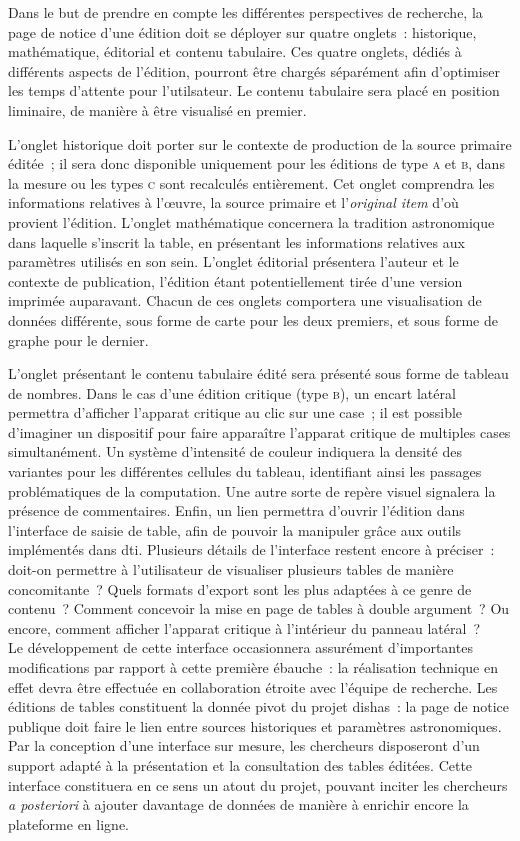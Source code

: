 \documentclass[a4paper,12pt,twoside]{book}
\newcommand{\eng}{\emph}
\newcommand{\oi}{\eng{original item}\xspace}
\newcommand{\dishas}{\gls{dishas}\xspace}
\newcommand{\dti}{\gls{dti}\xspace}
\begin{document}
Dans le but de prendre en compte les différentes perspectives de recherche, la page de notice d'une édition doit se déployer sur quatre onglets~: historique, mathématique, éditorial et contenu tabulaire. Ces quatre onglets, dédiés à différents aspects de l'édition, pourront être chargés séparément afin d'optimiser les temps d'attente pour l'utilsateur. Le contenu tabulaire sera placé en position liminaire, de manière à être visualisé en premier.

L'onglet historique doit porter sur le contexte de production de la source primaire éditée~; il sera donc disponible uniquement pour les éditions de type \textsc{a} et \textsc{b}, dans la mesure ou les types \textsc{c} sont recalculés entièrement. Cet onglet comprendra les informations relatives à l'œuvre, la source primaire et l'\oi d'où provient l'édition. L'onglet mathématique concernera la tradition astronomique dans laquelle s'inscrit la table, en présentant les informations relatives aux paramètres utilisés en son sein. L'onglet éditorial présentera l'auteur et le contexte de publication, l'édition étant potentiellement tirée d'une version imprimée auparavant. Chacun de ces onglets comportera une visualisation de données différente, sous forme de carte pour les deux premiers, et sous forme de graphe pour le dernier.

L'onglet présentant le contenu tabulaire édité sera présenté sous forme de tableau de nombres. Dans le cas d'une édition critique (type \textsc{b}), un encart latéral permettra d'afficher l'apparat critique au clic sur une case~; il est possible d'imaginer un dispositif pour faire apparaître l'apparat critique de multiples cases simultanément. Un système d'intensité de couleur indiquera la densité des variantes pour les différentes cellules du tableau, identifiant ainsi les passages problématiques de la computation. Une autre sorte de repère visuel signalera la présence de commentaires. Enfin, un lien permettra d'ouvrir l'édition dans l'interface de saisie de table, afin de pouvoir la manipuler grâce aux outils implémentés dans \dti. Plusieurs détails de l'interface restent encore à préciser~: doit-on permettre à l'utilisateur de visualiser plusieurs tables de manière concomitante~? Quels formats d'export sont les plus adaptées à ce genre de contenu~? Comment concevoir la mise en page de tables à double argument~? Ou encore, comment afficher l'apparat critique à l’intérieur du panneau latéral~?\\ 

Le développement de cette interface occasionnera assurément d'importantes modifications par rapport à cette première ébauche~: la réalisation technique en effet devra être effectuée en collaboration étroite avec l'équipe de recherche. Les éditions de tables constituent la donnée pivot du projet \dishas~: la page de notice publique doit faire le lien entre sources historiques et paramètres astronomiques. Par la conception d'une interface sur mesure, les chercheurs disposeront d'un support adapté à la présentation et la consultation des tables éditées. Cette interface constituera en ce sens un atout du projet, pouvant inciter les chercheurs \emph{a posteriori} à ajouter davantage de données de manière à enrichir encore la plateforme en ligne.
\end{document}
